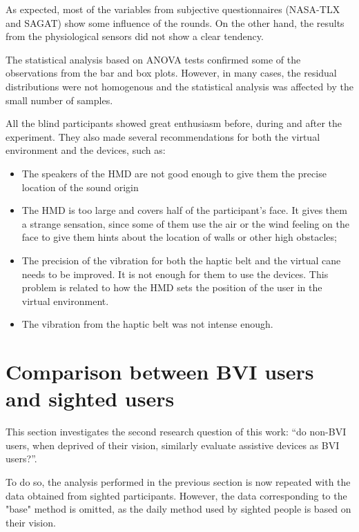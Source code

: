 As expected, most of the variables from subjective questionnaires (NASA-TLX and SAGAT) show some influence of the rounds. On the other hand, the results from the physiological sensors did not show a clear tendency. 

The statistical analysis based on ANOVA tests confirmed some of the observations from the bar and box plots. However, in many cases, the residual distributions were not homogenous and the statistical analysis was affected by the small number of samples. 

All the blind participants showed great enthusiasm before, during and after the experiment. They also made several recommendations for both the virtual environment and the devices, such as:

\begin{itemize}
    \item The speakers of the HMD are not good enough to give them the precise location of the sound origin
    \item The HMD is too large and covers half of the participant's face. It gives them a strange sensation, since some of them use the air or the wind feeling on the face to give them hints about the location of walls or other high obstacles;
    \item The precision of the vibration for both the haptic belt and the virtual cane needs to be improved. It is not enough for them to use the devices. This problem is related to how the HMD sets the position of the user in the virtual environment. \\    
    \item The vibration from the haptic belt was not intense enough.
\end{itemize}

\section{Comparison between BVI users and sighted users}
\label{sec:results_obj_2}

This section investigates the second research question of this work: “do non-BVI users, when deprived of their vision, similarly evaluate assistive devices as BVI users?”. 

To do so, the analysis performed in the previous section is now repeated with the data obtained from sighted participants. However, the data corresponding to the "base" method is omitted, as the daily method used by sighted people is based on their vision.

